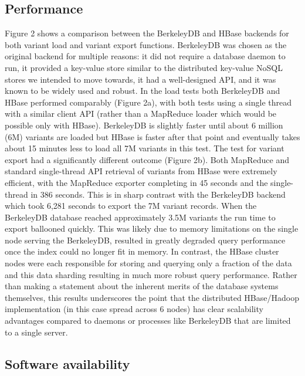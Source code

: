 \documentclass[10pt]{bmc_article}
\newenvironment{bmcformat}{\begin{raggedright}\baselineskip20pt\sloppy\setboolean{publ}{false}}{\end{raggedright}\baselineskip20pt\sloppy}
\begin{document}
\begin{bmcformat}
\subsection*{Performance}

Figure 2 shows a comparison between the BerkeleyDB and HBase backends for both variant load and variant export functions. BerkeleyDB was chosen as the original backend for multiple reasons: it did not require a database daemon to run, it provided a key-value store similar to the distributed key-value NoSQL stores we intended to move towards, it had a well-designed API, and it was known to be widely used and robust. In the load tests both BerkeleyDB and HBase performed comparably (Figure 2a), with both tests using a single thread with a similar client API (rather than a MapReduce loader which would be possible only with HBase). BerkeleyDB is slightly faster until about 6 million (6M) variants are loaded but HBase is faster after that point and eventually takes about 15 minutes less to load all 7M variants in this test. The test for variant export had a significantly different outcome (Figure 2b). Both MapReduce and standard single-thread API retrieval of variants from HBase were extremely efficient, with the MapReduce exporter completing in 45 seconds and the single-thread in 386 seconds. This is in sharp contrast with the BerkeleyDB backend which took 6,281 seconds to export the 7M variant records. When the BerkeleyDB database reached approximately 3.5M variants the run time to export ballooned quickly. This was likely due to memory limitations on the single node serving the BerkeleyDB, resulted in greatly degraded query performance once the index could no longer fit in memory. In contrast, the HBase cluster nodes were each responsible for storing and querying only a fraction of the data and this data sharding resulting in much more robust query performance. Rather than making a statement about the inherent merits of the database systems themselves, this results underscores the point that the distributed HBase/Hadoop implementation (in this case spread across 6 nodes) has clear scalability advantages compared to daemons or processes like BerkeleyDB that are limited to a single server.

\subsection*{Software availability}
  

\end{bmcformat}
\end{document}
